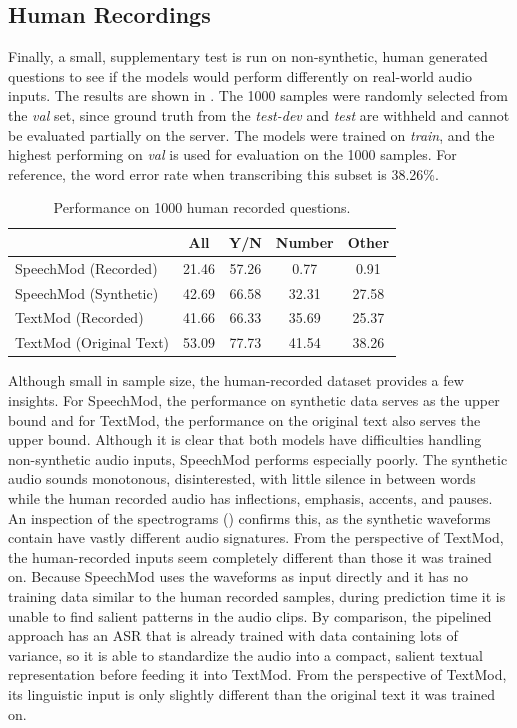\documentclass[letterpaper]{article} %
\begin{document}
\subsection{Human Recordings}
Finally, a small, supplementary test is run on non-synthetic, human generated questions to see if the models would perform differently on real-world audio inputs. The results are shown in . The 1000 samples were randomly selected from the \textit{val} set, since ground truth from the \textit{test-dev} and \textit{test} are withheld and cannot be evaluated partially on the server. The models were trained on \textit{train}, and the highest performing on \textit{val} is used for evaluation on the 1000 samples. For reference, the word error rate when transcribing this subset is 38.26\%.

\begin{table}[t]
\centering
\caption{Performance on 1000 human recorded questions.}
\label{table:recorded}
\begin{tabular}{l|cccc}
                        & All   & Y/N   & Number & Other \\ \hline
SpeechMod (Recorded)    & 21.46 & 57.26 & 0.77   & 0.91  \\
SpeechMod (Synthetic)   & 42.69 & 66.58 & 32.31  & 27.58 \\ \hline
TextMod (Recorded)      & 41.66 & 66.33 & 35.69  & 25.37 \\
TextMod (Original Text) & 53.09 & 77.73 & 41.54  & 38.26
\end{tabular}
\end{table}

Although small in sample size, the human-recorded dataset provides a few insights. For SpeechMod, the performance on synthetic data serves as the upper bound and for TextMod, the performance on the original text also serves the upper bound. Although it is clear that both models have difficulties handling non-synthetic audio inputs, SpeechMod performs especially poorly. The synthetic audio sounds monotonous, disinterested, with little silence in between words while the human recorded audio has inflections, emphasis, accents, and pauses. An inspection of the spectrograms () confirms this, as the synthetic waveforms contain have vastly different audio signatures. From the perspective of TextMod, the human-recorded inputs seem completely different than those it was trained on. Because SpeechMod uses the waveforms as input directly and it has no training data similar to the human recorded samples, during prediction time it is unable to find salient patterns in the audio clips. By comparison, the pipelined approach has an ASR that is already trained with data containing lots of variance, so it is able to standardize the audio into a compact, salient textual representation before feeding it into TextMod. From the perspective of TextMod, its linguistic input is only slightly different than the original text it was trained on.
\end{document}
